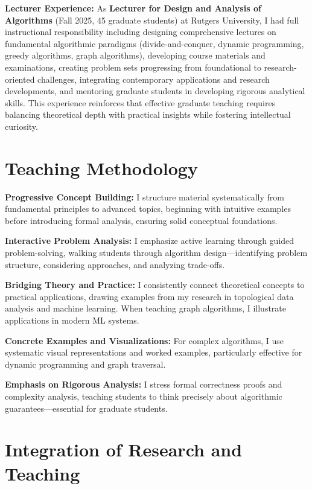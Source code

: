 \documentclass[11pt,letterpaper]{article}
\begin{document}
\textbf{Lecturer Experience:} As \textbf{Lecturer for Design and Analysis of Algorithms} (Fall 2025, 45 graduate students) at Rutgers University, I had full instructional responsibility including designing comprehensive lectures on fundamental algorithmic paradigms (divide-and-conquer, dynamic programming, greedy algorithms, graph algorithms), developing course materials and examinations, creating problem sets progressing from foundational to research-oriented challenges, integrating contemporary applications and research developments, and mentoring graduate students in developing rigorous analytical skills. This experience reinforces that effective graduate teaching requires balancing theoretical depth with practical insights while fostering intellectual curiosity.

\section*{Teaching Methodology}

\textbf{Progressive Concept Building:} I structure material systematically from fundamental principles to advanced topics, beginning with intuitive examples before introducing formal analysis, ensuring solid conceptual foundations.

\textbf{Interactive Problem Analysis:} I emphasize active learning through guided problem-solving, walking students through algorithm design---identifying problem structure, considering approaches, and analyzing trade-offs.

\textbf{Bridging Theory and Practice:} I consistently connect theoretical concepts to practical applications, drawing examples from my research in topological data analysis and machine learning. When teaching graph algorithms, I illustrate applications in modern ML systems.

\textbf{Concrete Examples and Visualizations:} For complex algorithms, I use systematic visual representations and worked examples, particularly effective for dynamic programming and graph traversal.

\textbf{Emphasis on Rigorous Analysis:} I stress formal correctness proofs and complexity analysis, teaching students to think precisely about algorithmic guarantees---essential for graduate students.

\section*{Integration of Research and Teaching}
\end{document}
